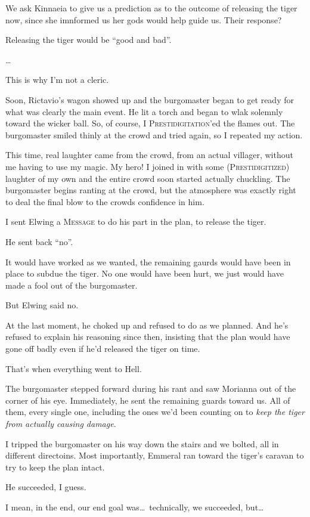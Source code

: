We ask Kinnaeia to give us a prediction as to the outcome of releasing the tiger now, since she imnformed us her gods would help guide us. Their response?

Releasing the tiger would be ``good and bad''.

\dots

This is why I'm not a cleric.

Soon, Rictavio's wagon showed up and the burgomaster began to get ready for what was clearly the main event. He lit a torch and began to wlak solemnly toward the wicker ball. So, of course, I \textsc{Prestidigitation}'ed the flames out. The burgomaster smiled thinly at the crowd and tried again, so I repeated my action.

This time, real laughter came from the crowd, from an actual villager, without me having to use my magic. My hero! I joined in with some (\textsc{Prestidigitized}) laughter of my own and the entire crowd soon started actually chuckling. The burgomaster begins ranting at the crowd, but the atmosphere was exactly right to deal the final blow to the crowds confidence in him.

I sent Elwing a \textsc{Message} to do his part in the plan, to release the tiger.

He sent back ``no''.

It would have worked as we wanted, the remaining gaurds would have been in place to subdue the tiger. No one would have been hurt, we just would have made a fool out of the burgomaster.

But Elwing said no.

At the last moment, he choked up and refused to do as we planned. And he's refused to explain his reasoning since then, insisting that the plan would have gone off badly even if he'd released the tiger on time.

That's when everything went to Hell.

The burgomaster stepped forward during his rant and saw Morianna out of the corner of his eye. Immediately, he sent the remaining guards toward us. All of them, every single one, including the ones we'd been counting on to \emph{keep the tiger from actually causing damage}.

I tripped the burgomaster on his way down the stairs and we bolted, all in different directoins. Most importantly, Emmeral ran toward the tiger's caravan to try to keep the plan intact.

He succeeded, I guess.

I mean, in the end, our end goal was\dots\ technically, we succeeded, but\dots

